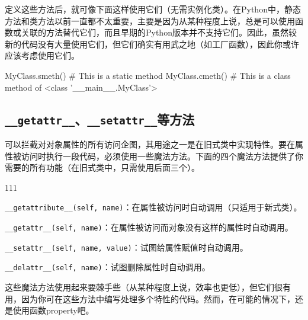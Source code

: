 定义这些方法后，就可像下面这样使用它们（无需实例化类）。在Python中，静态方法和类方法以前一直都不太重要，主要是因为从某种程度上说，总是可以使用函数或关联的方法替代它们，而且早期的Python版本并不支持它们。因此，虽然较新的代码没有大量使用它们，但它们确实有用武之地（如工厂函数），因此你或许应该考虑使用它们。
\begin{pyc}
MyClass.smeth()  # This is a static method
MyClass.cmeth()  # This is a class method of <class '__main__.MyClass'>
\end{pyc}

\subsection{\texttt{\_\_getattr\_\_}、\texttt{\_\_setattr\_\_}等方法}
可以拦截对对象属性的所有访问企图，其用途之一是在旧式类中实现特性。要在属性被访问时执行一段代码，必须使用一些魔法方法。下面的四个魔法方法提供了你需要的所有功能（在旧式类中，只需使用后面三个）。
\begin{dinglist}{111}
\item \verb|__getattribute__(self, name)|：在属性被访问时自动调用（只适用于新式类）。
\item \verb|__getattr__(self, name)|：在属性被访问而对象没有这样的属性时自动调用。
\item \verb|__setattr__(self, name, value)|：试图给属性赋值时自动调用。
\item \verb|__delattr__(self, name)|：试图删除属性时自动调用。
\end{dinglist}
这些魔法方法使用起来要棘手些（从某种程度上说，效率也更低），但它们很有用，因为你可在这些方法中编写处理多个特性的代码。然而，在可能的情况下，还是使用函数property吧。

